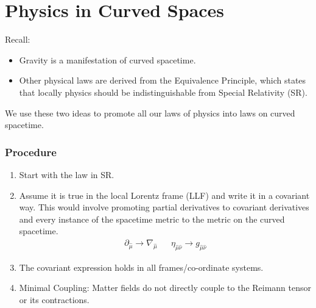 \documentclass[10pt]{article}
\begin{document}
        	    
    \newpage
    \part{Physics in Curved Spaces}
        Recall:
        \begin{itemize}
            \item Gravity is a manifestation of curved spacetime.
            \item Other physical laws are derived from the Equivalence Principle, which states that locally physics should be indistinguishable from Special Relativity (SR).
        \end{itemize}
        We use these two ideas to promote all our laws of physics into laws on curved spacetime. 
            \section{Procedure}\label{sec:Procedure}
                \begin{enumerate}
                    \item Start with the law in SR.
                    \item Assume it is true in the local Lorentz frame (LLF) and write it in a covariant way. 
                    This would involve promoting partial derivatives to covariant derivatives and every instance of the spacetime metric to the metric on the curved spacetime.
                        \begin{align}
                            \partial_{\hat{\mu}} \to \nabla_{\hat{\mu}}  && \eta_{\hat{\mu}\hat{\nu}} \to g_{\hat{\mu}\hat{\nu}} 
                        \end{align}
                    \item The covariant expression holds in all frames/co-ordinate systems.
                    \item Minimal Coupling: Matter fields do not directly couple to the Reimann tensor or its contractions.
                \end{enumerate}
\end{document}
